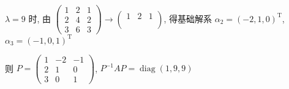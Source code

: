 \begin{enumerate}
			       \(\lambda=9\) 时, 由 \(\begin{pmatrix}
				       1 & 2 & 1 \\
				       2 & 4 & 2 \\
				       3 & 6 & 3
			       \end{pmatrix} \to
			       \begin{pmatrix}
				       1 & 2 & 1 \\
				         &   &   \\
				         &   &
			       \end{pmatrix} \), 得基础解系 \(\alpha_2=(-2,1,0)^{\mathrm{T}}\), \(\alpha_3=(-1,0,1)^{\mathrm{T}}\)

			       则 \(P=
			       \begin{pmatrix}
				       1 & -2 & -1 \\
				       2 & 1  & 0  \\
				       3 & 0  & 1
			       \end{pmatrix} \), \(P^{-1}AP=\operatorname{diag}(1,9,9)\)
		 \end{enumerate}

